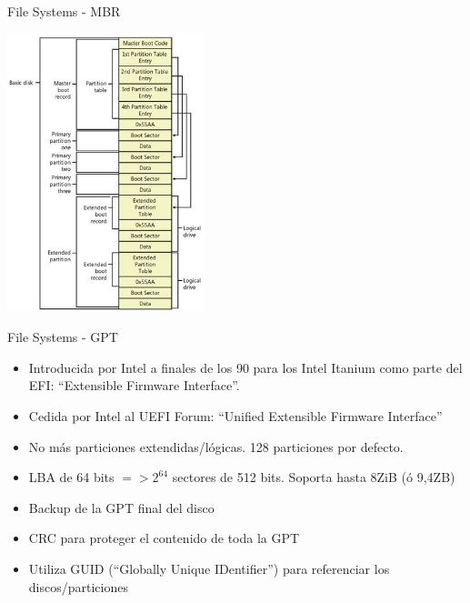\begin{frame}{File Systems - MBR}
 \begin{center}
  \includegraphics[width=0.43\textwidth]{images/mbr3.png}
 \end{center}
\end{frame}

\begin{frame}{File Systems - GPT}
  \begin{itemize}
   \item Introducida por Intel a finales de los 90 para los Intel Itanium como parte del EFI: 
     ``Extensible Firmware Interface''.
   \item Cedida por Intel al UEFI Forum: ``Unified Extensible Firmware Interface''
   \item No más particiones extendidas/lógicas. 128 particiones por defecto.
   \item LBA de 64 bits $=> 2^{64}$ sectores de 512 bits. Soporta hasta 8ZiB (ó 9,4ZB)
   \item Backup de la GPT final del disco
   \item CRC para proteger el contenido de toda la GPT
   \item Utiliza GUID (``Globally Unique IDentifier'') para referenciar los discos/particiones
  \end{itemize}
\end{frame}

